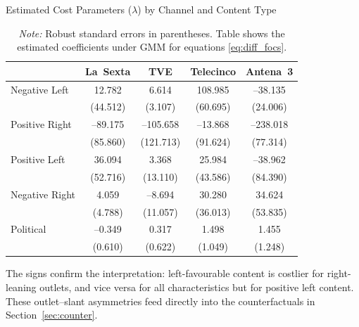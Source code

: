 \documentclass[12pt]{article}
\begin{document}
\begin{table}[H]
	\caption{Estimated Cost Parameters ($\lambda$) by Channel and Content Type}
	\label{table:costs}
	\centering\small
	\begin{tabular}{lcccc}
		\toprule
		& La~Sexta & TVE & Telecinco & Antena~3 \\
		\midrule
		Negative Left   
		& 12.782   &  6.614   & 108.985   & --38.135  \\
		& (44.512) & (3.107)  & (60.695)  & (24.006)  \\
				\midrule
		Positive Right  
		& --89.175 & --105.658 & --13.868  & --238.018 \\
		& (85.860) & (121.713) & (91.624)  & (77.314)  \\
		\midrule
		Positive Left   
		& 36.094   &  3.368   &  25.984   & --38.962  \\
		& (52.716) & (13.110) & (43.586)  & (84.390)  \\
				\midrule
		Negative Right  
		&  4.059   & --8.694  &  30.280   &  34.624   \\
		& (4.788)  & (11.057) & (36.013)  & (53.835)  \\
		\midrule
		Political 
		& --0.349  &  0.317   &   1.498   &   1.455   \\
		& (0.610)  & (0.622)  &  (1.049)  &  (1.248)  \\
		\bottomrule
	\end{tabular}
	\vspace{0.5em}
	\caption*{\scriptsize\emph{Note:} Robust standard errors in parentheses. Table shows the estimated coefficients under GMM for equations \ref{eq:diff_focs}.}
\end{table}



The signs confirm the interpretation: left-favourable content is costlier for right-leaning outlets, and vice versa for all characteristics but for positive left content. 
These outlet–slant asymmetries feed directly into the counterfactuals in Section~\ref{sec:counter}.
\end{document}
